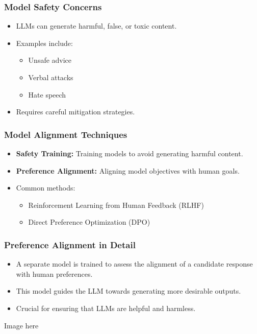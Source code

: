 \documentclass{beamer}
\begin{document}
\begin{frame}
    \frametitle{Model Safety Concerns}
    \begin{itemize}
        \item LLMs can generate harmful, false, or toxic content.
        \item Examples include:
            \begin{itemize}
                \item Unsafe advice
                \item Verbal attacks
                \item Hate speech
            \end{itemize}
        \item  Requires careful mitigation strategies.
    \end{itemize}
\end{frame}

\begin{frame}
    \frametitle{Model Alignment Techniques}
    \begin{itemize}
        \item \textbf{Safety Training:} Training models to avoid generating harmful content.
        \item \textbf{Preference Alignment:} Aligning model objectives with human goals.
        \item Common methods:
            \begin{itemize}
                \item Reinforcement Learning from Human Feedback (RLHF)
                \item Direct Preference Optimization (DPO)
            \end{itemize}
    \end{itemize}
\end{frame}

\begin{frame}
    \frametitle{Preference Alignment in Detail}
    \begin{itemize}
        \item A separate model is trained to assess the alignment of a candidate response with human preferences.
        \item This model guides the LLM towards generating more desirable outputs.
        \item  Crucial for ensuring that LLMs are helpful and harmless.
    \end{itemize}
    Image here
\end{frame}
\end{document}
